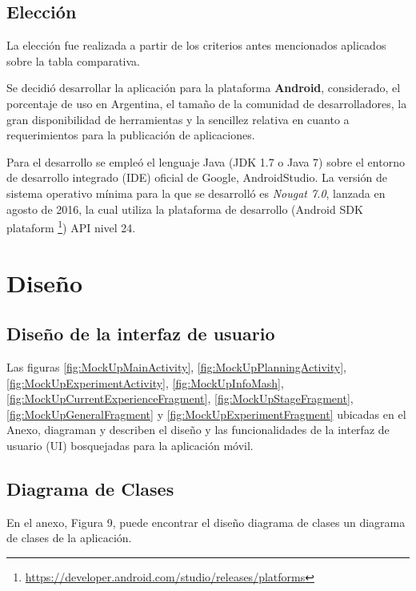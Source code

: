     
    \subsection{Elección}
    \par
    La elección fue realizada a partir de los criterios antes mencionados aplicados sobre la tabla comparativa.
    \par
    Se decidió desarrollar la aplicación para la plataforma \textbf{Android}, considerado, el porcentaje de uso en Argentina, el tamaño de la comunidad de desarrolladores, la gran disponibilidad de herramientas y la sencillez relativa en cuanto a requerimientos para la publicación de aplicaciones.
    
    \par Para el desarrollo se empleó el lenguaje Java (JDK 1.7 o Java 7) sobre el entorno de desarrollo integrado (IDE) oficial de Google, AndroidStudio. La versión de sistema operativo mínima para la que se desarrolló es \textit{Nougat 7.0}, lanzada en agosto de 2016, la cual utiliza la plataforma de desarrollo (Android SDK plataform \footnote{\url{https://developer.android.com/studio/releases/platforms}}) API nivel 24.




\section{Diseño}
    \subsection{Diseño de la interfaz de usuario}
        \par Las figuras \ref{fig:MockUpMainActivity}, \ref{fig:MockUpPlanningActivity}, \ref{fig:MockUpExperimentActivity}, \ref{fig:MockUpInfoMash}, \ref{fig:MockUpCurrentExperienceFragment}, \ref{fig:MockUpStageFragment}, \ref{fig:MockUpGeneralFragment} y \ref{fig:MockUpExperimentFragment} ubicadas en el Anexo, diagraman y describen el diseño y las funcionalidades de la interfaz de usuario (UI) bosquejadas para la aplicación móvil.
        
    \subsection{Diagrama de Clases}
    \par
    En el anexo, Figura 9, puede encontrar el diseño diagrama de clases  un diagrama de clases  de la aplicación.
    

